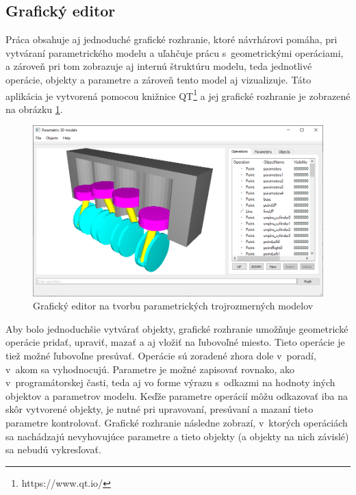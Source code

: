 \subsection*{Grafický editor}
\label{sec:grafickyEditor}

 
Práca obsahuje aj jednoduché grafické rozhranie, ktoré návrhárovi pomáha, pri vytváraní parametrického modelu a uľahčuje prácu s~geometrickými operáciami, a zároveň pri tom zobrazuje aj internú štruktúru modelu, teda jednotlivé operácie, objekty a parametre a zároveň tento model aj vizualizuje.
Táto aplikácia je vytvorená pomocou knižnice QT\footnote{https://www.qt.io/} a jej grafické rozhranie je zobrazené na obrázku \ref{fig:GraphicEditor}.


\begin{figure}[H]
	\centering
	\includegraphics[width=1\textwidth]{obrazky-figures/Parametric_editor.png}
	\caption{Grafický editor na tvorbu parametrických trojrozmerných modelov}
	\label{fig:GraphicEditor}
\end{figure}



 
Aby bolo jednoduchšie vytvárať objekty, grafické rozhranie umožňuje geometrické operácie pridať, upraviť, mazať a aj vložiť na ľubovoľné miesto. Tieto operácie je tiež možné ľubovoľne presúvať. Operácie sú zoradené zhora dole v~poradí, v~akom sa vyhodnocujú. Parametre je možné zapisovať rovnako, ako v~programátorskej časti, teda aj vo forme výrazu s~odkazmi na hodnoty iných objektov a parametrov modelu. Keďže parametre operácií môžu odkazovať iba na skôr vytvorené objekty, je nutné pri upravovaní, presúvaní a mazaní tieto parametre kontrolovať. Grafické rozhranie následne zobrazí, v~ktorých operáciách sa nachádzajú nevyhovujúce parametre a tieto objekty (a objekty na nich závislé) sa nebudú vykresľovať.

